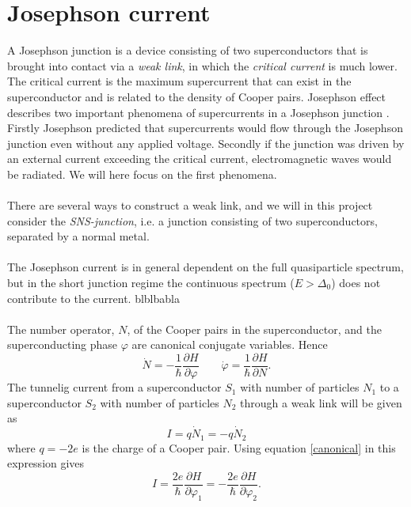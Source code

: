 \section{Josephson current}
A Josephson junction is a device consisting of two superconductors that is brought into contact via a \textit{weak link}, in which the \textit{critical current} is much lower. The critical current is the maximum supercurrent that can exist in the superconductor and is related to the density of Cooper pairs. Josephson effect describes two important phenomena of supercurrents in a Josephson junction \cite{josephson62}. Firstly Josephson predicted that supercurrents would flow through the Josephson junction even without any applied voltage. Secondly if the junction was driven by an external current exceeding the critical current, electromagnetic waves would be radiated. We will here focus on the first phenomena.
\\
\\
There are several ways to construct a weak link, and we will in this project consider the \textit{SNS-junction}, i.e. a junction consisting of two superconductors, separated by a normal metal.
\\
\\
The Josephson current is in general dependent on the full quasiparticle spectrum, but in the short junction regime the continuous spectrum ($E>\Delta_0$) does not contribute to the current. blblbabla
\\
\\
The number operator, $N$, of the Cooper pairs in the superconductor, and the superconducting phase $\varphi$ are canonical conjugate variables. Hence
\begin{equation}
    \dot{N} = -\frac{1}{\hbar}\frac{\partial H}{\partial \varphi}
    \qquad
    \dot{\varphi} = \frac{1}{\hbar}\frac{\partial H}{\partial N}.
    \label{canonical}
\end{equation}
The tunnelig current from a superconductor $S_1$ with number of particles $N_1$ to a superconductor $S_2$ with number of particles $N_2$ through a weak link will be given as
\begin{equation}
    I = q \dot{N}_1 = -q \dot{N}_2
\end{equation}
where $q=-2e$ is the charge of a Cooper pair. Using equation \eqref{canonical} in this expression gives
\begin{equation}
    I = \frac{2e}{\hbar}\frac{\partial H}{\partial \varphi_1} = -\frac{2e}{\hbar}\frac{\partial H}{\partial \varphi_2}.
\end{equation}
